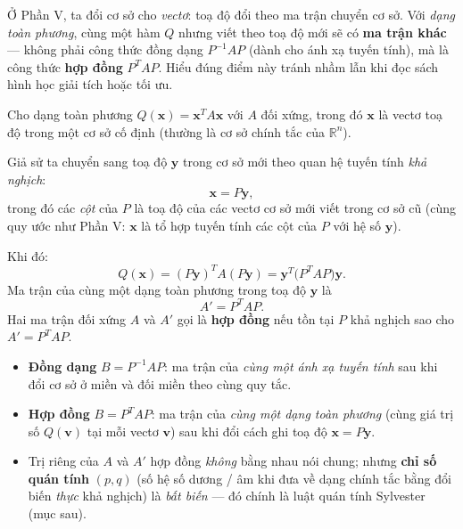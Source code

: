 \documentclass[12pt,a4paper]{article}
\begin{document}
\begin{dongco}
Ở Phần V, ta đổi cơ sở cho \emph{vectơ}: toạ độ đổi theo ma trận chuyển cơ sở. Với \emph{dạng toàn phương}, cùng một hàm $Q$ nhưng viết theo toạ độ mới sẽ có \textbf{ma trận khác} --- không phải công thức đồng dạng $P^{-1}AP$ (dành cho ánh xạ tuyến tính), mà là công thức \textbf{hợp đồng} $P^T A P$. Hiểu đúng điểm này tránh nhầm lẫn khi đọc sách hình học giải tích hoặc tối ưu.
\end{dongco}

\begin{dinhnghia}
  Cho dạng toàn phương $Q(\mathbf{x}) = \mathbf{x}^T A \mathbf{x}$ với $A$ đối xứng, trong đó $\mathbf{x}$ là vectơ toạ độ trong một cơ sở cố định (thường là cơ sở chính tắc của $\mathbb{R}^n$).

  Giả sử ta chuyển sang toạ độ $\mathbf{y}$ trong cơ sở mới theo quan hệ tuyến tính \emph{khả nghịch}:
  \[
    \mathbf{x} = P \mathbf{y},
  \]
  trong đó các \emph{cột} của $P$ là toạ độ của các vectơ cơ sở mới viết trong cơ sở cũ (cùng quy ước như Phần V: $\mathbf{x}$ là tổ hợp tuyến tính các cột của $P$ với hệ số $\mathbf{y}$).

  Khi đó:
  \[
    Q(\mathbf{x}) = (P\mathbf{y})^T A (P\mathbf{y}) = \mathbf{y}^T \bigl(P^T A P\bigr) \mathbf{y}.
  \]
  Ma trận của cùng một dạng toàn phương trong toạ độ $\mathbf{y}$ là
  \[
    \boxed{A' = P^T A P.}
  \]
  Hai ma trận đối xứng $A$ và $A'$ gọi là \textbf{hợp đồng} nếu tồn tại $P$ khả nghịch sao cho $A' = P^T A P$.
\end{dinhnghia}

\begin{luuy}[title={Khác đồng dạng $P^{-1}AP$}]
\begin{itemize}
  \item \textbf{Đồng dạng} $B = P^{-1} A P$: ma trận của \emph{cùng một ánh xạ tuyến tính} sau khi đổi cơ sở ở miền và đối miền theo cùng quy tắc.
  \item \textbf{Hợp đồng} $B = P^T A P$: ma trận của \emph{cùng một dạng toàn phương} (cùng giá trị số $Q(\mathbf{v})$ tại mỗi vectơ $\mathbf{v}$) sau khi đổi cách ghi toạ độ $\mathbf{x} = P\mathbf{y}$.
  \item Trị riêng của $A$ và $A'$ hợp đồng \emph{không} bằng nhau nói chung; nhưng \textbf{chỉ số quán tính} $(p, q)$ (số hệ số dương / âm khi đưa về dạng chính tắc bằng đổi biến \emph{thực} khả nghịch) là \emph{bất biến} --- đó chính là luật quán tính Sylvester (mục sau).
\end{itemize}
\end{luuy}
\end{document}
